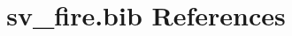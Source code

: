 \documentclass[12pt]{article}
\begin{document}
\nocite{*}
\title{sv\_fire.bib References}
\maketitle
%



\end{document}
